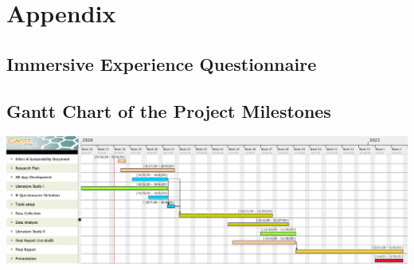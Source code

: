 \documentclass[12pt,twoside,english]{article}
\begin{document}

% 


\appendix
\section{Appendix}
\label{sect:appendix}

\subsection{Immersive Experience Questionnaire}
\label{sect:ieq}


\subsection{Gantt Chart of the Project Milestones}
\label{sect:gantt_chart}

\includegraphics[width=\textwidth]{imgs/project_milestones}

\printglossary[type=\acronymtype, nonumberlist]
\clearpage
\end{document}
